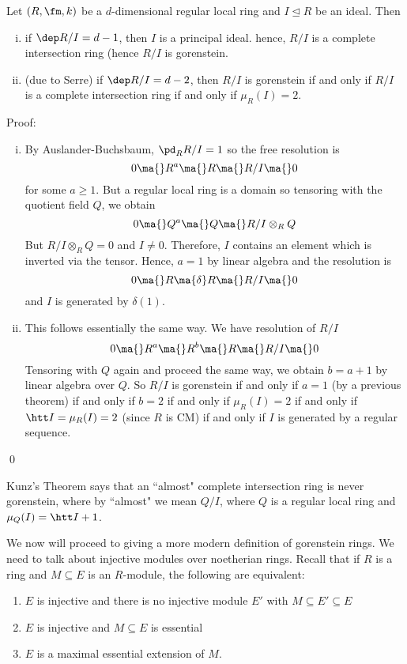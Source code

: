 \begin{thmm}
Let $(R,\fm,k)$ be a $d$-dimensional regular local ring and $I \unlhd R$ be an ideal. Then
\begin{enumerate}[(i)]
\item if $\dep R/I=d-1$, then $I$ is a principal ideal. hence, $R/I$ is a complete intersection ring (hence $R/I$ is gorenstein. 

\item (due to Serre) if $\dep R/I=d-2$, then $R/I$ is gorenstein if and only if $R/I$ is a complete intersection ring if and only if $\mu_R(I)=2$.
\end{enumerate}
\end{thmm}

\noindent Proof:
\begin{enumerate}[(i)]
\item By Auslander-Buchsbaum, $\pd_R R/I=1$ so the free resolution is
\[
0 \ma{} R^a \ma{} R \ma{} R/I \ma{} 0
\]
for some $a \geq 1$. But a regular local ring is a domain so tensoring with the quotient field $Q$, we obtain
\[
0 \ma{} Q^a \ma{} Q \ma{} R/I \otimes_R Q
\]
But $R/I \otimes_R Q=0$ and $I \neq 0$. Therefore, $I$ contains an element which is inverted via the tensor. Hence, $a=1$ by linear algebra and the resolution is
\[
0 \ma{} R \ma{\delta} R \ma{} R/I \ma{} 0
\]
and $I$ is generated by $\delta(1)$.

\item This follows essentially the same way. We have resolution of $R/I$
\[
0 \ma{} R^a \ma{} R^b \ma{} R \ma{} R/I \ma{} 0
\]
Tensoring with $Q$ again and proceed the same way, we obtain $b=a+1$ by linear algebra over $Q$. So $R/I$ is gorenstein if and only if $a=1$ (by a previous theorem) if and only if $b=2$ if and only if $\mu_R(I)=2$ if and only if $\htt I=\mu_R(I)=2$ (since $R$ is CM) if and only if $I$ is generated by a regular sequence. 
\end{enumerate}
\qed \\

\begin{rem}
Kunz's Theorem says that an ``almost" complete intersection ring is never gorenstein, where by ``almost" we mean $Q/I$, where $Q$ is a regular local ring and $\mu_Q(I)=\htt I+1$. 
\end{rem}

We now will proceed to giving a more modern definition of gorenstein rings. We need to talk about injective modules over noetherian rings. Recall that if $R$ is a ring and $M \subseteq E$ is an $R$-module, the following are equivalent:
\begin{enumerate}[(1)]
\item $E$ is injective and there is no injective module $E'$ with $M \subseteq E' \subseteq E$
\item $E$ is injective and $M \subseteq E$ is essential
\item $E$ is a maximal essential extension of $M$.
\end{enumerate}

